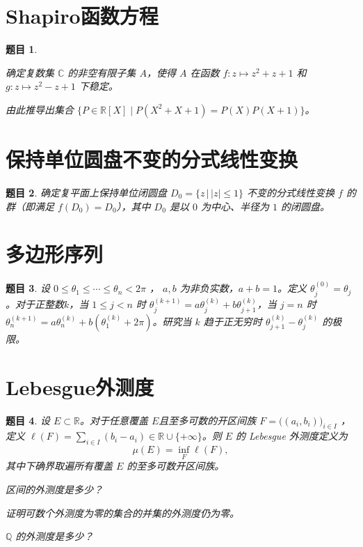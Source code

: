 \documentclass[12pt,UTF8,fontset=none]{ctexbook}
\theoremstyle{exercisestyle}
\newtheorem*{exercise}{题目}
\theoremstyle{solutionstyle}
\begin{document}
\section{Shapiro函数方程}
\begin{exercise}
  \begin{subquestions}
    \item 确定复数集 \(\mathbb{C}\) 的非空有限子集 \(A\)，使得 \(A\) 在函数 \(f: z \mapsto z^2 + z + 1\) 和 \(g: z \mapsto z^2 - z + 1\) 下稳定。
    \item 由此推导出集合 \(\{P \in \mathbb{R}[X] \mid P(X^2 + X + 1) = P(X)P(X + 1)\}\)。
  \end{subquestions}
\end{exercise}

\section{保持单位圆盘不变的分式线性变换}
\begin{exercise}
确定复平面上保持单位闭圆盘 \( D_0 = \{z \, | \, |z| \leqslant 1\}\) 不变的分式线性变换 \( f \) 的群（即满足 \( f(D_0) = D_0 \)），其中 \( D_0 \) 是以 \( 0 \) 为中心、半径为 \( 1 \) 的闭圆盘。
\end{exercise}

\section{多边形序列}
\begin{exercise}
设 \(0 \le \theta_1 \le \cdots \le \theta_n < 2\pi\) ， \(a, b\) 为非负实数，$a + b = 1$。定义 \(\theta_j^{(0)} = \theta_j\)。对于正整数$k$，当 \(1 \le j < n\) 时 \(\theta_j^{(k+1)} = a\theta_j^{(k)} + b\theta_{j+1}^{(k)}\)，当 \(j = n\) 时 \(\theta_n^{(k+1)} = a\theta_n^{(k)} + b(\theta_1^{(k)} + 2\pi)\)。研究当 \(k\) 趋于正无穷时 \(\theta_{j+1}^{(k)} - \theta_j^{(k)}\) 的极限。
\end{exercise}

\section{Lebesgue外测度}
\begin{exercise}
设 \(E \subset \mathbb{R}\)。对于任意覆盖 \(E\)且至多可数的开区间族 \(F = \bigl((a_i, b_i)\bigr)_{i \in I}\) ，定义 \(\ell(F) = \sum_{i \in I} (b_i - a_i) \in \mathbb{R} \cup \{+\infty\}\)。则 \(E\) 的 Lebesgue 外测度定义为
\[
\mu(E) = \inf_{F} \ell(F),
\]
其中下确界取遍所有覆盖 \(E\) 的至多可数开区间族。
\begin{subquestions}
\item 区间的外测度是多少？
\item 证明可数个外测度为零的集合的并集的外测度仍为零。
\item \(\mathbb{Q}\) 的外测度是多少？
\end{subquestions}
\end{exercise}
\end{document}
